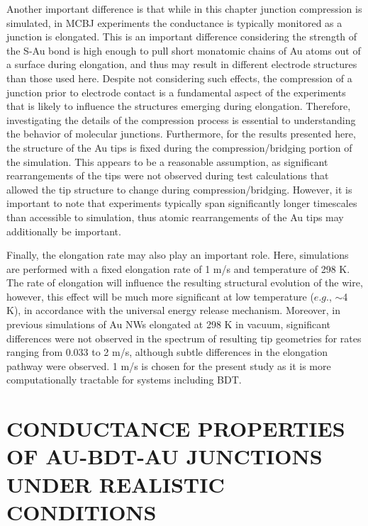 \documentclass[10pt]{report}  %
\begin{document}
Another important difference is that while in this chapter junction compression is simulated, in MCBJ experiments the conductance is typically monitored as a junction is elongated.  This is an important difference considering the strength of the S-Au bond is high enough to pull short monatomic chains of Au atoms out of a surface during elongation,\cite{Kruger:2002,Kim-acs-nano:2011} and thus may result in different electrode structures than those used here.  Despite not considering such effects, the compression of a junction prior to electrode contact is a fundamental aspect of the experiments that is likely to influence the structures emerging during elongation.  Therefore, investigating the details of the compression process is essential to understanding the behavior of molecular junctions.  Furthermore, for the results presented here, the structure of the Au tips is fixed during the compression/bridging portion of the simulation.  This appears to be a reasonable assumption, as significant rearrangements of the tips were not observed during test calculations that allowed the tip structure to change during compression/bridging.  However, it is important to note that experiments typically span significantly longer timescales than accessible to simulation, thus atomic rearrangements of the Au tips may additionally be important. 

Finally, the elongation rate may also play an important role.  Here, simulations are performed with a fixed elongation rate of 1 m/s and temperature of 298 K.  The rate of elongation will influence the resulting structural evolution of the wire, however, this effect will be much more significant at low temperature ($e.g.$, $\sim$4 K), in accordance with the universal energy release mechanism. \cite{Pu:2008,Iacovella_scidac:2011}  Moreover, in previous simulations of Au NWs elongated at 298 K in vacuum, significant differences were not observed in the spectrum of resulting tip geometries for rates ranging from 0.033 to 2 m/s, although subtle differences in the elongation pathway were observed. \cite{Iacovella_scidac:2011}  1 m/s is chosen for the present study as it is more computationally tractable for systems including BDT.


%
%
%
%
\chapter{CONDUCTANCE PROPERTIES OF AU-BDT-AU JUNCTIONS UNDER REALISTIC CONDITIONS}
\end{document}
